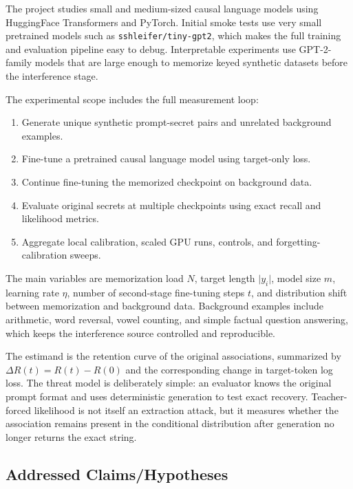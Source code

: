 \documentclass{article}
\begin{document}
The project studies small and medium-sized causal language models using HuggingFace Transformers and PyTorch. Initial smoke tests use very small pretrained models such as \texttt{sshleifer/\allowbreak{}tiny-gpt2}, which makes the full training and evaluation pipeline easy to debug. Interpretable experiments use GPT-2-family models that are large enough to memorize keyed synthetic datasets before the interference stage.

The experimental scope includes the full measurement loop:

\begin{enumerate}[leftmargin=*]
    \item Generate unique synthetic prompt-secret pairs and unrelated background examples.
    \item Fine-tune a pretrained causal language model using target-only loss.
    \item Continue fine-tuning the memorized checkpoint on background data.
    \item Evaluate original secrets at multiple checkpoints using exact recall and likelihood metrics.
    \item Aggregate local calibration, scaled GPU runs, controls, and forgetting-calibration sweeps.
\end{enumerate}

The main variables are memorization load $N$, target length $\lvert y_i \rvert$, model size $m$, learning rate $\eta$, number of second-stage fine-tuning steps $t$, and distribution shift between memorization and background data. Background examples include arithmetic, word reversal, vowel counting, and simple factual question answering, which keeps the interference source controlled and reproducible.

The estimand is the retention curve of the original associations, summarized by $\Delta R(t)=R(t)-R(0)$ and the corresponding change in target-token log loss. The threat model is deliberately simple: an evaluator knows the original prompt format and uses deterministic generation to test exact recovery. Teacher-forced likelihood is not itself an extraction attack, but it measures whether the association remains present in the conditional distribution after generation no longer returns the exact string.

\subsection{Addressed Claims/Hypotheses}
\end{document}

